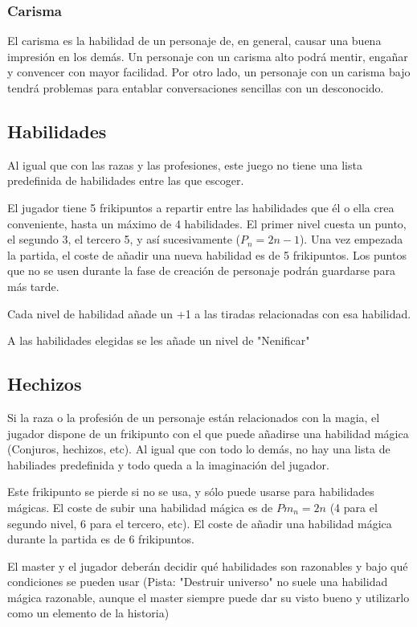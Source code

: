 \subsubsection*{Carisma}
El carisma es la habilidad de un personaje de, en general, causar una buena impresión en los demás. Un personaje con un carisma alto podrá mentir, engañar y convencer con mayor facilidad. Por otro lado, un personaje con un carisma bajo tendrá problemas para entablar conversaciones sencillas con un desconocido.

\subsection{Habilidades}

Al igual que con las razas y las profesiones, este juego no tiene una lista predefinida de habilidades entre las que escoger. 
\par
El jugador tiene 5 frikipuntos a repartir entre las habilidades que él o ella crea conveniente, hasta un máximo de 4 habilidades. El primer nivel cuesta un punto, el segundo 3, el tercero 5, y así sucesivamente ($P_{n}=2n-1$). Una vez empezada la partida, el coste de añadir una nueva habilidad es de 5 frikipuntos. Los puntos que no se usen durante la fase de creación de personaje podrán guardarse para más tarde.
\par
Cada nivel de habilidad añade un +1 a las tiradas relacionadas con esa habilidad.
\par
A las habilidades elegidas se les añade un nivel de "Nenificar"


\subsection{Hechizos}

Si la raza o la profesión de un personaje están relacionados con la magia, el jugador dispone de un frikipunto con el que puede añadirse una habilidad mágica (Conjuros, hechizos, etc). Al igual que con todo lo demás, no hay una lista de habiliades predefinida y todo queda a la imaginación del jugador.
\par
Este frikipunto se pierde si no se usa, y sólo puede usarse para habilidades mágicas. El coste de subir una habilidad mágica es de $Pm_{n}=2n$ (4 para el segundo nivel, 6 para el tercero, etc). El coste de añadir una habilidad mágica durante la partida es de 6 frikipuntos. 
\par 
El master y el jugador deberán decidir qué habilidades son razonables y bajo qué condiciones se pueden usar (Pista: "Destruir universo" no suele una habilidad mágica razonable, aunque el master siempre puede dar su visto bueno y utilizarlo como un elemento de la historia)

